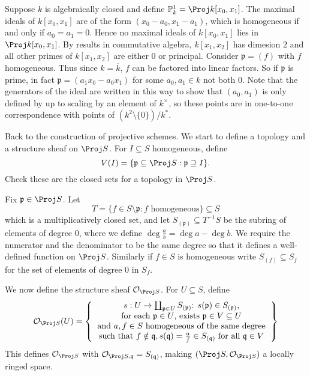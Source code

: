 \documentclass[a4paper]{article}
\renewcommand*{\P}{\mathbb{P}}
\newcommand{\sh}[1]{\mathcal{#1}} %
\begin{document}
\begin{eg}
  Suppose \(k\) is algebraically closed and define \(\P^1_k = \Proj k[x_0, x_1]\). The maximal ideals of \(k[x_0, x_1]\) are of the form \((x_0 - a_0, x_1 - a_1)\), which is homogeneous if and only if \(a_0 = a_1 = 0\). Hence no maximal ideals of \(k[x_0, x_1]\) lies in \(\Proj k[x_0, x_1]\). By results in commutative algebra, \(k[x_1, x_2]\) has dimesion \(2\) and all other primes of \(k[x_1, x_2]\) are either \(0\) or principal. Consider \(\mathfrak p = (f)\) with \(f\) homogeneous. Thus since \(k = \overline k\), \(f\) can be factored into linear factors. So if \(\mathfrak p\) is prime, in fact \(\mathfrak p = (a_1 x_0 - a_0 x_1)\) for some \(a_0, a_1 \in k\) not both \(0\). Note that the generators of the ideal are written in this way to show that \((a_0, a_1)\) is only defined by up to scaling by an element of \(k^\times\), so these points are in one-to-one correspondence with points of \((k^2 \setminus \{0\})/k^*\).
\end{eg}

Back to the construction of projective schemes. We start to define a topology and a structure sheaf on \(\Proj S\). For \(I \subseteq S\) homogeneous, define
\[
  V(I) = \{\mathfrak p \subseteq \Proj S: \mathfrak p \supseteq I\}.
\]
Check these are the closed sets for a topology in \(\Proj S\).

Fix \(\mathfrak p \in \Proj S\). Let
\[
  T = \{f \in S \setminus \mathfrak p: f \text{ homogeneous}\} \subseteq S
\]
which is a multiplicatively closed set, and let \(S_{(\mathfrak p)} \subseteq T^{-1}S\) be the subring of elements of degree \(0\), where we define \(\deg \frac{a}{b} = \deg a - \deg b\). We require the numerator and the denominator to be the same degree so that it defines a well-defined function on \(\Proj S\). Similarly if \(f \in S\) is homogeneous  write \(S_{(f)} \subseteq S_f\) for the set of elements of degree \(0\) in \(S_f\).

We now define the structure sheaf \(\sh O_{\Proj S}\). For \(U \subseteq S\), define
\[
  \sh O_{\Proj S}(U) =
  \left\{
    \begin{tabular}{c}
      \(s: U \to \coprod_{\mathfrak p \in U} S_{(\mathfrak p)}\): \(s(\mathfrak p) \in S_{(\mathfrak p)}\), \\
      for each \(\mathfrak p \in U\), exists \(\mathfrak p \in V \subseteq U\) \\
      and \(a, f \in S\) homogeneous of the same degree \\
      such that \(f \notin \mathfrak q, s(\mathfrak q) = \frac{a}{f} \in S_{(\mathfrak q)}\) for all \(\mathfrak q \in V\)
    \end{tabular}
  \right\}
\]
This defines \(\sh O_{\Proj S}\) with \(\sh O_{\Proj S, \mathfrak q} = S_{(\mathfrak q)}\), making \((\Proj S, \sh O_{\Proj S})\) a locally ringed space.
\end{document}
